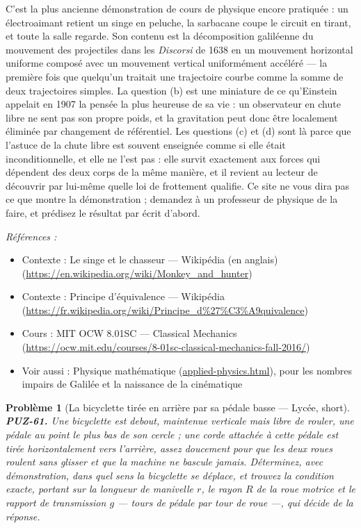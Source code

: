 \documentclass[11pt]{article}
\newtheorem{problem}{Problème}
\newenvironment{refs}{\par\small\noindent\emph{Références :}\begin{itemize}\setlength\itemsep{0pt}}{\end{itemize}\normalsize}
\begin{document}
\noindent C'est la plus ancienne démonstration de cours de physique encore
pratiquée : un électroaimant retient un singe en peluche, la sarbacane coupe le circuit en
tirant, et toute la salle regarde. Son contenu est la décomposition galiléenne du mouvement
des projectiles dans les \textit{Discorsi} de 1638 en un mouvement horizontal uniforme composé
avec un mouvement vertical uniformément accéléré --- la première fois que quelqu'un traitait
une trajectoire courbe comme la somme de deux trajectoires simples. La question (b) est une
miniature de ce qu'Einstein appelait en 1907 la pensée la plus heureuse de sa vie : un
observateur en chute libre ne sent pas son propre poids, et la gravitation peut donc être
localement éliminée par changement de référentiel. Les questions (c) et (d) sont là parce
que l'astuce de la chute libre est souvent enseignée comme si elle était inconditionnelle,
et elle ne l'est pas : elle survit exactement aux forces qui dépendent des deux corps de la
même manière, et il revient au lecteur de découvrir par lui-même quelle loi de frottement
qualifie. Ce site ne vous dira pas ce que montre la démonstration ; demandez à un professeur
de physique de la faire, et prédisez le résultat par écrit d'abord.

\begin{refs}
\item Contexte : Le singe et le chasseur --- Wikipédia (en anglais) (\url{https://en.wikipedia.org/wiki/Monkey_and_hunter})
\item Contexte : Principe d'équivalence --- Wikipédia (\url{https://fr.wikipedia.org/wiki/Principe_d%27%C3%A9quivalence})
\item Cours : MIT OCW 8.01SC --- Classical Mechanics (\url{https://ocw.mit.edu/courses/8-01sc-classical-mechanics-fall-2016/})
\item Voir aussi : Physique mathématique (\url{applied-physics.html}), pour les nombres impairs de Galilée et la naissance de la cinématique
\end{refs}

\bigskip

\begin{problem}[{La bicyclette tirée en arrière par sa pédale basse --- Lycée, short}]
\textbf{PUZ-61.} Une bicyclette est debout, maintenue verticale mais
libre de rouler, une pédale au point le plus bas de son cercle ; une corde attachée à cette
pédale est tirée horizontalement vers l'arrière, assez doucement pour que les deux roues
roulent sans glisser et que la machine ne bascule jamais. Déterminez, avec démonstration,
dans quel sens la bicyclette se déplace, et trouvez la condition exacte, portant sur la
longueur de manivelle $ r $, le rayon $ R $ de la roue motrice et le rapport de
transmission $ g $ --- tours de pédale par tour de roue ---, qui décide de la réponse.
\end{problem}
\end{document}
